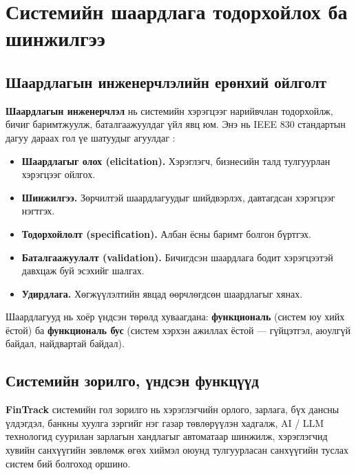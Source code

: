 ﻿%

\chapter{Системийн шаардлага тодорхойлох ба шинжилгээ}
\label{Chapter2}
\pagecolor{white}


\section{Шаардлагын инженерчлэлийн ерөнхий ойлголт}
\textbf{Шаардлагын инженерчлэл} нь системийн хэрэгцээг нарийвчлан тодорхойлж, бичиг баримтжуулж, баталгаажуулдаг үйл явц юм. Энэ нь IEEE 830 стандартын дагуу дараах гол үе шатуудыг агуулдаг \cite{mn_softeng}:
\begin{itemize}
    \item [1.] \textbf{Шаардлагыг олох (elicitation).} Хэрэглэгч, бизнесийн талд тулгуурлан хэрэгцээг ойлгох.
    \item [2.] \textbf{Шинжилгээ.} Зөрчилтэй шаардлагуудыг шийдвэрлэх, давтагдсан хэрэгцээг нэгтгэх.
    \item [3.] \textbf{Тодорхойлолт (specification).} Албан ёсны баримт болгон бүртгэх.
    \item [4.] \textbf{Баталгаажуулалт (validation).} Бичигдсэн шаардлага бодит хэрэгцээтэй давхцаж буй эсэхийг шалгах.
    \item [5.] \textbf{Удирдлага.} Хөгжүүлэлтийн явцад өөрчлөгдсөн шаардлагыг хянах.
\end{itemize}

Шаардлагууд нь хоёр үндсэн төрөлд хуваагдана: \textbf{функциональ} (систем юу хийх ёстой) ба \textbf{функциональ бус} (систем хэрхэн ажиллах ёстой --- гүйцэтгэл, аюулгүй байдал, найдвартай байдал).

\section{Системийн зорилго, үндсэн функцүүд}
\textbf{FinTrack} системийн гол зорилго нь хэрэглэгчийн орлого, зарлага, бүх дансны үлдэгдэл, банкны хуулга зэргийг нэг газар төвлөрүүлэн хадгалж, AI / LLM технологид суурилан зарлагын хандлагыг автоматаар шинжилж, хэрэглэгчид хувийн санхүүгийн зөвлөмж өгөх хиймэл оюунд тулгуурласан санхүүгийн туслах систем бий болгоход оршино.

